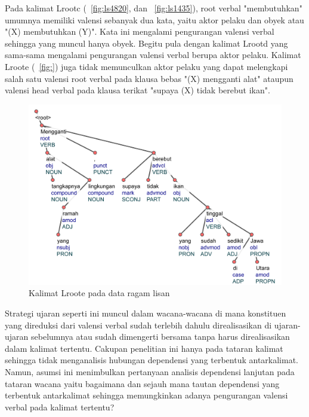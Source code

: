 Pada kalimat Lrootc (\pic~\ref{fig:ls4820}, dan \pic~\ref{fig:ls1435}), root verbal "membutuhkan" umumnya memiliki valensi sebanyak dua kata, yaitu aktor pelaku dan obyek  atau "(X) membutuhkan (Y)". Kata ini mengalami pengurangan valensi verbal sehingga yang muncul hanya obyek. Begitu pula dengan kalimat Lrootd yang sama-sama mengalami pengurangan valensi verbal berupa aktor pelaku. Kalimat Lroote (\pic~\ref{fig:}) juga tidak memunculkan aktor pelaku yang dapat melengkapi salah satu valensi root verbal pada klausa bebas "(X) mengganti alat" ataupun valensi head verbal pada klausa terikat "supaya (X) tidak berebut ikan".

\begin{figure}
	\centering \includegraphics[width=1
	\textwidth] {pics/ls1265.jpg} 
	\caption{Kalimat Lroote pada data ragam lisan}
	\label{fig:ls1265} 
\end{figure}

Strategi ujaran seperti ini muncul dalam wacana-wacana di mana konstituen yang direduksi dari valensi verbal sudah terlebih dahulu direalisasikan di ujaran-ujaran sebelumnya atau sudah dimengerti bersama tanpa harus direalisasikan dalam kalimat tertentu. Cakupan penelitian ini hanya pada tataran kalimat sehingga tidak menganalisis hubungan dependensi yang terbentuk antarkalimat. Namun, asumsi ini menimbulkan pertanyaan analisis dependensi lanjutan pada tataran wacana yaitu bagaimana dan sejauh mana tautan dependensi yang terbentuk antarkalimat sehingga memungkinkan adanya pengurangan valensi verbal pada kalimat tertentu?

